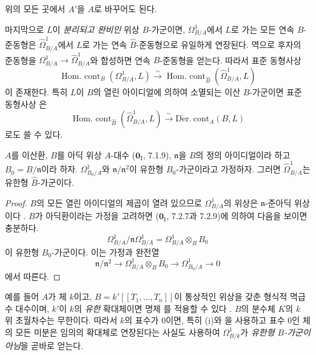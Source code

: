 \begin{env}[20.7.14]
위의 모든 곳에서 $A'$을 $A$로 바꾸어도 된다.

마지막으로 $L$이 \emph{분리되고 완비인} 위상 $B$-가군이면,
$\Omega^1_{B/A}$에서 $L$로 가는 모든 연속 $B$-준동형은
$\widehat{\Omega}^1_{B/A}$에서 $L$로 가는 연속 $\widehat B$-준동형으로
유일하게 연장된다. 역으로 후자의 준동형을
$\Omega^1_{B/A}\to\widehat{\Omega}^1_{B/A}$와 합성하면 연속
$B$-준동형을 얻는다. 따라서 표준 동형사상
\[
  \operatorname{Hom.\ cont}_B(\Omega^1_{B/A},L)
  \xrightarrow{\sim}
  \operatorname{Hom.\ cont}_{\widehat B}
    (\widehat{\Omega}^1_{B/A},L)
\]
이 존재한다. 특히 $L$이 $B$의 열린 아이디얼에 의하여 소멸되는 이산
$B$-가군이면 표준 동형사상 은
\begin{equation}
\tag{20.7.14.4}
\label{0.20.7.14.4-ko}
  \operatorname{Hom.\ cont}_{\widehat B}
    (\widehat{\Omega}^1_{B/A},L)
  \xrightarrow{\sim}\operatorname{D\acute{e}r.\ cont}_A(B,L)
\end{equation}
로도 쓸 수 있다.
\end{env}

\begin{proposition}[20.7.15]
\label{0.20.7.15-ko}
$A$를 이산환, $B$를 아딕 위상 $A$-대수
($\mathbf{0}_{\mathrm I}$, 7.1.9), $\mathfrak n$을 $B$의 정의
아이디얼이라 하고 $B_0=B/\mathfrak n$이라 하자.
$\Omega^1_{B_0/A}$와 $\mathfrak n/\mathfrak n^2$이 유한형
$B_0$-가군이라고 가정하자. 그러면 $\widehat{\Omega}^1_{B/A}$는
유한형 $\widehat B$-가군이다.
\end{proposition}

\begin{proof}
$B$의 모든 열린 아이디얼의 제곱이 열려 있으므로
$\Omega^1_{B/A}$의 위상은 $\mathfrak n$-준아딕 위상이다
. $B$가 아딕환이라는 가정을 고려하면
($\mathbf{0}_{\mathrm I}$, 7.2.7과 7.2.9)에 의하여 다음을 보이면
충분하다.
\[
  \Omega^1_{B/A}/\mathfrak n\Omega^1_{B/A}
  =\Omega^1_{B/A}\otimes_B B_0
\]
이 유한형 $B_0$-가군이다. 이는 가정과 완전열
\[
  \mathfrak n/\mathfrak n^2\longrightarrow
  \Omega^1_{B/A}\otimes_B B_0\longrightarrow
  \Omega^1_{B_0/A}\longrightarrow0
\]
에서 따른다.
\end{proof}

\begin{env}[20.7.16]
\label{0.20.7.16-ko}
예를 들어 $A$가 체 $k$이고, $B=k'[[T_1,\ldots,T_n]]$이 통상적인
위상을 갖춘 형식적 멱급수 대수이며, $k'$이 $k$의 \emph{유한}
확대체이면 명제 를 적용할 수 있다
. $B$의 분수체 $K$의 $k$ 위 초월차수는
무한이다. 따라서 $k$의 표수가 $0$이면, 특히
(i)와 을 사용하고 표수 $0$인
체의 모든 미분은 임의의 확대체로 연장된다는 사실도 사용하여
$\Omega^1_{B/k}$가 \emph{유한형 $B$-가군이 아님}을 곧바로 얻는다.
\end{env}

